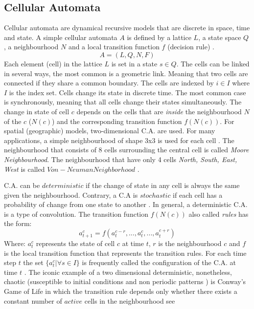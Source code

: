 \documentclass[fleqn,10pt]{SelfArx} %
\begin{document}
\subsection{Cellular Automata}
Cellular automata are dynamical recursive models that are discrete in space, time and state. A simple cellular automata $A$ is defined by a lattice $L$, a state space $Q$, a neighbourhood $N$ and a local transition function $f$ (decision rule) \citep{adamatzky1994}.
$$A = ( L, Q, N, F) $$
Each element (cell) in the lattice $L$ is set in a state $s \in Q$. The cells can be linked in several ways, the most common is a geometric link. Meaning that two cells are connected if they share a common boundary. The cells are indexed by $i \in I$ where $I$ is the index set. Cells change its state in discrete time. The most common case is synchronously, meaning that all cells change their states simultaneously. 
The change in state of cell $c$ depends on the cells that are {\em inside} the neighbourhood $N$ of the $c$ ($N(c)$) and the corresponding transition function $f(N(c))$.
For spatial (geographic) models, two-dimensional C.A. are used. For many applications, a simple neighbourhood of shape 3x3 is used for each cell \citep{Balzter1998}. The neighbourhood that consists of 8 cells surrounding the central cell is called {\em Moore Neighbourhood}. The neighbourhood that have only 4 cells {\em North, South, East, West} is called $Von-Neuman Neighborhood$ \citep{adamatzky1994}. 

C.A. can be $deterministic$ if the change of state in any cell is always the same given the neighbourhood. Contrary, a C.A is $stochastic$ if each cell has a probability of change from one state to another \citep{Balzter1998}. In general, a deterministic C.A. is a type of convolution. 
The transition function $f(N(c))$ also called {\em rules} has the form:
$$a_{t+1}^{c} = f(a_{t}^{c-r},...,a_{t}^{c},...,a_{t}^{c+r})$$
Where: 
$a_{t}^{c}$ represents the state of cell $c$ at time $t$, $r$ is the neighbourhood $c$ and $f$ is the local transition function that represents the transition rules. For each time step $t$ the set $\{a_{t}^{c} | \forall s \in I \}$ is frequently called the configuration of the C.A. at time $t$ \citep{Balzter1998}.
The iconic example of a two dimensional deterministic, nonetheless, chaotic (susceptible to initial conditions and non periodic patterns \citep{devaney2003}) is Conway's Game of Life in which the transition rule depends only whether there exists a constant number of $active$ cells in the neighbourhood see \citep{gardner1971}
\end{document}
